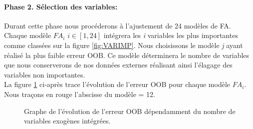 	\paragraph{Phase 2. Sélection des variables:}
	Durant cette phase nous procéderons à l'ajustement de 24 modèles de FA. Chaque modèle $FA_i$ ${i \in [1,24]}$ intégrera les \textit{i} variables les plus importantes comme classées sur la figure \ref{fig:VARIMP}. Nous choisissons le modèle \textit{j} ayant réalisé la plus faible erreur OOB. Ce modèle déterminera le nombre  de variables que nous conserverons de nos données externes réalisant ainsi l'élagage des variables non importantes.\\
	La figure \ref{fig:laggedvars} ci-après trace l'évolution de l'erreur OOB pour chaque modèle $FA_i$. Nous traçons en rouge l'abscisse du modèle  = 12.
							\begin{figure}[H]
							\centering
							\caption{Graphe de l'évolution de l'erreur OOB dépendamment du nombre de variables exogènes intégrées.}
							\label{fig:laggedvars}
							\end{figure}